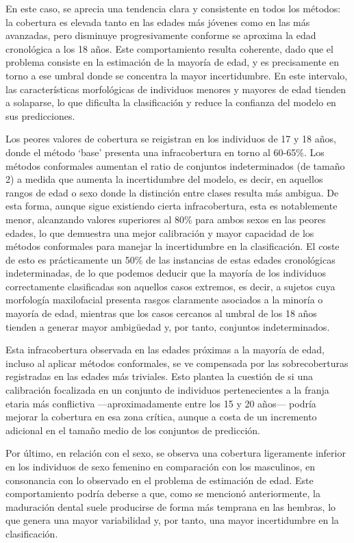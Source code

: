 En este caso, se aprecia una tendencia clara y consistente en todos los métodos: la cobertura es elevada tanto en las edades más jóvenes como en las más avanzadas, pero disminuye progresivamente conforme se aproxima la edad cronológica a los 18 años. Este comportamiento resulta coherente, dado que el problema consiste en la estimación de la mayoría de edad, y es precisamente en torno a ese umbral donde se concentra la mayor incertidumbre. En este intervalo, las características morfológicas de individuos menores y mayores de edad tienden a solaparse, lo que dificulta la clasificación y reduce la confianza del modelo en sus predicciones. 

Los peores valores de cobertura se reigistran en los individuos de 17 y 18 años, donde el método `base' presenta una infracobertura en torno al 60-65\%. Los métodos conformales aumentan el ratio de conjuntos indeterminados (de tamaño 2) a medida que aumenta la incertidumbre del modelo, es decir, en aquellos rangos de edad o sexo donde la distinción entre clases resulta más ambigua. De esta forma, aunque sigue existiendo cierta infracobertura, esta es notablemente menor, alcanzando valores superiores al 80\% para ambos sexos en las peores edades, lo que demuestra una mejor calibración y mayor capacidad de los métodos conformales para manejar la incertidumbre en la clasificación. El coste de esto es prácticamente un 50\% de las instancias de estas edades cronológicas indeterminadas, de lo que podemos deducir que la mayoría de los individuos correctamente clasificadas son aquellos casos extremos, es decir, a sujetos cuya morfología maxilofacial presenta rasgos claramente asociados a la minoría o mayoría de edad, mientras que los casos cercanos al umbral de los 18 años tienden a generar mayor ambigüedad y, por tanto, conjuntos indeterminados.

Esta infracobertura observada en las edades próximas a la mayoría de edad, incluso al aplicar métodos conformales, se ve compensada por las sobrecoberturas registradas en las edades más triviales. Esto plantea la cuestión de si una calibración focalizada en un conjunto de individuos pertenecientes a la franja etaria más conflictiva ---aproximadamente entre los 15 y 20 años--- podría mejorar la cobertura en esa zona crítica, aunque a costa de un incremento adicional en el tamaño medio de los conjuntos de predicción.

Por último, en relación con el sexo, se observa una cobertura ligeramente inferior en los individuos de sexo femenino en comparación con los masculinos, en consonancia con lo observado en el problema de estimación de edad. Este comportamiento podría deberse a que, como se mencionó anteriormente, la maduración dental suele producirse de forma más temprana en las hembras, lo que genera una mayor variabilidad y, por tanto, una mayor incertidumbre en la clasificación.

